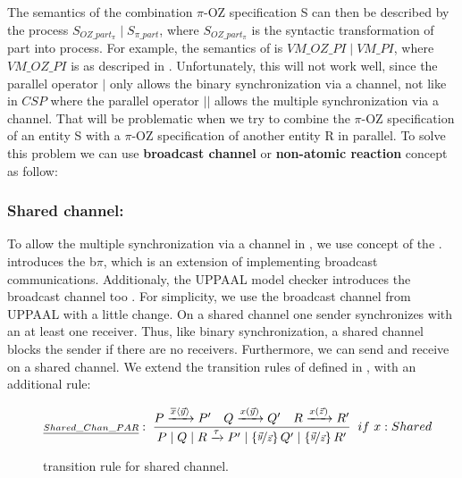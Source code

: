 The semantics of the combination $\pi$-OZ specification S can then be described by the \picalc{} process $S_{OZ\_part_\pi} \mid S_{\pi\_part}$, where $S_{OZ\_part_\pi}$ is the syntactic transformation of \oz{} part into \picalc{} process. For example, the semantics of  is $VM\_OZ\_PI \mid VM\_PI$, where $VM\_OZ\_PI$ is as descriped in . Unfortunately, this will not work well, since the parallel operator $|$ only allows the binary synchronization via a channel, not like in $CSP$ where the parallel operator $||$ allows the multiple synchronization via a channel. That will be problematic when we try to combine the $\pi$-OZ specification of an entity S with a $\pi$-OZ specification of another entity R in parallel. To solve this problem we can use \textbf{broadcast channel} or  \textbf{non-atomic reaction} concept as follow:

\subsubsection{Shared channel:}
To allow the multiple synchronization via a channel in \picalc{}, we use concept of the . \cite{ene} introduces the b$\pi$, which is an extension of \picalc{} implementing broadcast communications. Additionaly, the UPPAAL model checker introduces the broadcast channel too \cite{olderog08}. For simplicity, we use the broadcast channel from UPPAAL with a little change. On a shared channel one sender synchronizes with an at least one receiver. Thus, like binary synchronization, a shared channel blocks the sender if there are no receivers. Furthermore, we can send and receive on a shared channel. We extend the transition rules of \picalc{} defined in , with an additional rule:
\begin{figure}[H]
\begin{gather*}
\kalRuleM[if\ x: Shared]{Shared\_Chan\_PAR}{}{P \transs{\out{x}{\vec{y}}} P'}{Q \transs{\inp{x}{\vec{y}}} Q'}{R \transs{\inp{x}{\vec{z}}} R'}{\procpar{\procpar{P}{Q}}{R} \transs{\tau} 
\procpar{P'}{\procpar{\substitue{\vec{y}}{\vec{z}}Q'}{\substitue{\vec{y}}{\vec{z}}R'}}
}
\end{gather*}
\caption{transition rule for shared channel.}
\label{fig_broadcast_channel}
\end{figure}



